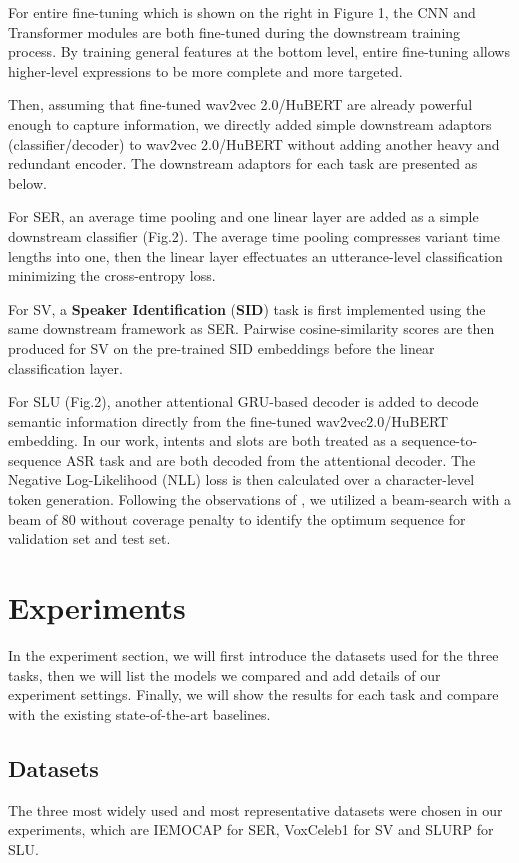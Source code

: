 \documentclass{article}
\begin{document}
For entire fine-tuning which is shown on the right in Figure 1, the CNN and Transformer modules are both fine-tuned during the downstream training process. By training general features at the bottom level, entire fine-tuning allows higher-level expressions to be more complete and more targeted.



Then, assuming that fine-tuned wav2vec 2.0/HuBERT are already powerful enough to capture information, we directly added simple downstream adaptors (classifier/decoder) to wav2vec 2.0/HuBERT without adding another heavy and redundant encoder. The downstream adaptors for each task are presented as below.

For SER, an average time pooling and one linear layer are added as a simple downstream classifier (Fig.2). The average time pooling compresses variant time lengths into one, then the linear layer effectuates an utterance-level classification minimizing the cross-entropy loss.

For SV, a \textbf{Speaker Identification} (\textbf{SID}) task is first implemented using the same downstream framework as SER. Pairwise cosine-similarity scores are then produced for SV on the pre-trained SID embeddings before the linear classification layer.

For SLU (Fig.2), another attentional GRU-based decoder is added to decode semantic information directly from the fine-tuned wav2vec2.0/HuBERT embedding. In our work, intents and slots are both treated as a sequence-to-sequence ASR task and are both decoded from the attentional decoder. The Negative Log-Likelihood (NLL) loss is then calculated over a character-level token generation. Following the observations of \cite{timers_and_such}, we utilized a beam-search with a beam of 80 without coverage penalty to identify the optimum sequence for validation set and test set.


\section{Experiments}

In the experiment section, we will first introduce the datasets used for the three tasks, then we will list the models we compared and add details of our experiment settings. Finally, we will show the results for each task and compare with the existing state-of-the-art baselines.

\subsection{Datasets}
The three most widely used and most representative datasets were chosen in our experiments, which are IEMOCAP for SER, VoxCeleb1 for SV and SLURP for SLU.
\end{document}

